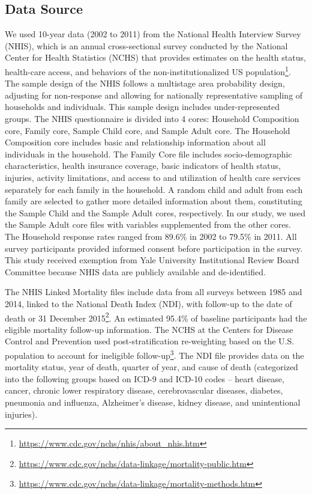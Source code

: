 \documentclass[reqno,11pt]{article}
\begin{document}
\subsection {Data Source}\label{sec:dsource}
We used 10-year data (2002 to 2011) from the National Health Interview Survey (NHIS), which is an annual cross-sectional survey conducted by the National Center for Health Statistics (NCHS) that provides estimates on the health status, health-care access, and behaviors of the non-institutionalized US population\footnote{\url{https://www.cdc.gov/nchs/nhis/about_nhis.htm}}.
The sample design of the NHIS follows a multistage area probability design, adjusting for non-response and allowing for nationally representative sampling of households and individuals. This sample design includes under-represented groups. The NHIS questionnaire is divided into 4 cores: Household Composition core, Family core, Sample Child core, and Sample Adult core. The Household Composition core includes basic and relationship information about all individuals in the household. The Family Core file includes socio-demographic characteristics, health insurance coverage, basic indicators of health status, injuries, activity limitations, and access to and utilization of health care services separately for each family in the household. A random child and adult from each family are selected to gather more detailed information about them, constituting the Sample Child and the Sample Adult cores, respectively. In our study, we used the Sample Adult core files with variables supplemented from the other cores. The Household response rates ranged from 89.6\% in 2002 to 79.5\% in 2011. All survey participants provided informed consent before participation in the survey. This study received exemption from Yale University Institutional Review Board Committee because NHIS data are publicly available and de-identified.

The NHIS Linked Mortality files include data from all surveys between 1985 and 2014, linked to the National Death Index (NDI), with follow-up to the date of death or 31 December 2015\footnote{\url{https://www.cdc.gov/nchs/data-linkage/mortality-public.htm}}.
An estimated 95.4\% of baseline participants had the eligible mortality follow-up information. The NCHS at the Centers for Disease Control and Prevention used post-stratification re-weighting based on the U.S. population to account for ineligible follow-up\footnote{\url{https://www.cdc.gov/nchs/data-linkage/mortality-methods.htm}}. The NDI file provides data on the mortality status, year of death, quarter of year, and cause of death (categorized into the following groups based on ICD-9 and ICD-10 codes – heart disease, cancer, chronic lower respiratory disease, cerebrovascular diseases, diabetes, pneumonia and influenza, Alzheimer’s disease, kidney disease, and unintentional injuries).
\end{document}
